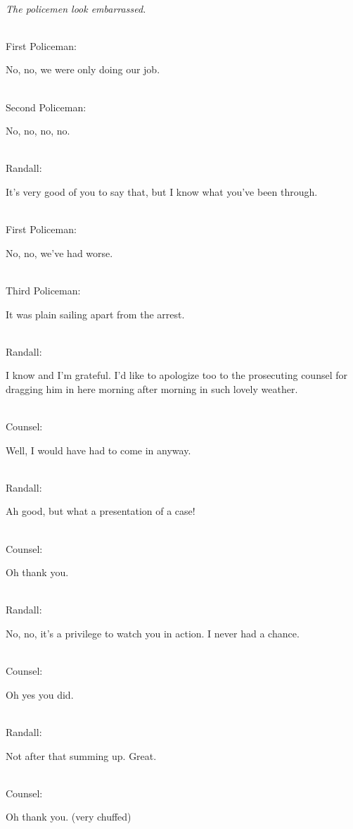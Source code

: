 \documentclass{report}
\begin{document}
\noindent\\\emph{The policemen look embarrassed.}

\noindent\\ First Policeman: 	

No, no, we were only doing our job.

\noindent\\ Second Policeman: 	

No, no, no, no.

\noindent\\ Randall: 	

It's very good of you to say that, but I know what you've been through.

\noindent\\ First Policeman:	

No, no, we've had worse.

\noindent\\ Third Policeman: 	

It was plain sailing apart from the arrest.

\noindent\\ Randall:

I know and I'm grateful. I'd like to apologize too to the prosecuting counsel for dragging him in here morning after morning in such lovely weather.

\noindent\\ Counsel: 	

Well, I would have had to come in anyway.

\noindent\\ Randall: 
	
Ah good, but what a presentation of a case!

\noindent\\ Counsel: 	

Oh thank you.

\noindent\\ Randall: 	

No, no, it's a privilege to watch you in action. I never had a chance.

\noindent\\ Counsel: 	

Oh yes you did.

\noindent\\ Randall: 	

Not after that summing up. Great.

\noindent\\ Counsel: 	

Oh thank you. (very chuffed)
\end{document}

